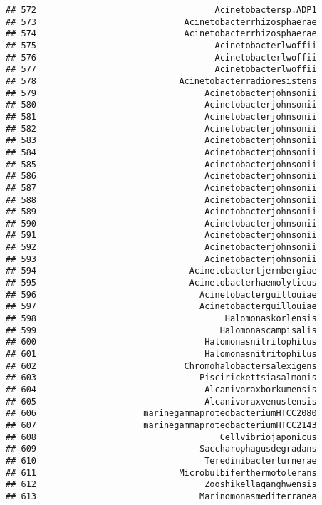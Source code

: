 \documentclass[
]{article}
\begin{document}
\begin{verbatim}
## 572                                   Acinetobactersp.ADP1
## 573                             Acinetobacterrhizosphaerae
## 574                             Acinetobacterrhizosphaerae
## 575                                   Acinetobacterlwoffii
## 576                                   Acinetobacterlwoffii
## 577                                   Acinetobacterlwoffii
## 578                            Acinetobacterradioresistens
## 579                                 Acinetobacterjohnsonii
## 580                                 Acinetobacterjohnsonii
## 581                                 Acinetobacterjohnsonii
## 582                                 Acinetobacterjohnsonii
## 583                                 Acinetobacterjohnsonii
## 584                                 Acinetobacterjohnsonii
## 585                                 Acinetobacterjohnsonii
## 586                                 Acinetobacterjohnsonii
## 587                                 Acinetobacterjohnsonii
## 588                                 Acinetobacterjohnsonii
## 589                                 Acinetobacterjohnsonii
## 590                                 Acinetobacterjohnsonii
## 591                                 Acinetobacterjohnsonii
## 592                                 Acinetobacterjohnsonii
## 593                                 Acinetobacterjohnsonii
## 594                              Acinetobactertjernbergiae
## 595                              Acinetobacterhaemolyticus
## 596                                Acinetobacterguillouiae
## 597                                Acinetobacterguillouiae
## 598                                     Halomonaskorlensis
## 599                                    Halomonascampisalis
## 600                                 Halomonasnitritophilus
## 601                                 Halomonasnitritophilus
## 602                             Chromohalobactersalexigens
## 603                                Piscirickettsiasalmonis
## 604                                 Alcanivoraxborkumensis
## 605                                 Alcanivoraxvenustensis
## 606                     marinegammaproteobacteriumHTCC2080
## 607                     marinegammaproteobacteriumHTCC2143
## 608                                    Cellvibriojaponicus
## 609                                Saccharophagusdegradans
## 610                                 Teredinibacterturnerae
## 611                            Microbulbiferthermotolerans
## 612                                 Zooshikellaganghwensis
## 613                                Marinomonasmediterranea

\end{verbatim}
\end{document}
